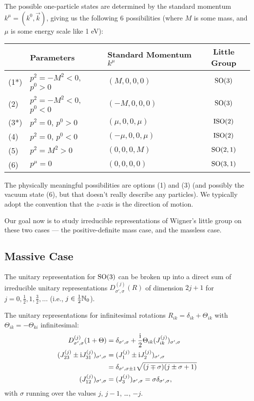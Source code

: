 The possible one-particle states are determined by the standard momentum
$k^{\mu}=(k^{0},\vec{k})$, giving us the following 6 possibilities (where $M$ is some
mass, and $\mu$ is some energy scale like 1 eV):
\begin{center}
\begin{tabular}{ll|l|c}
    & Parameters & Standard Momentum $k^{\mu}$ & Little Group\\\hline
(1*) & $p^{2}=-M^{2}<0$, $p^{0}>0$ & $(M,0,0,0)$ & $\operatorname{SO}(3)$\\
(2) & $p^{2}=-M^{2}<0$, $p^{0}<0$ & $(-M,0,0,0)$ & $\operatorname{SO}(3)$\\
(3*) & $p^{2}=0$, $p^{0}>0$ & $(\mu,0,0,\mu)$ & $\mathrm{ISO}(2)$\\
(4) & $p^{2}=0$, $p^{0}<0$ & $(-\mu,0,0,\mu)$ & $\mathrm{ISO}(2)$\\
(5) & $p^{2}=M^{2}>0$ & $(0,0,0,M)$ & $\operatorname{SO}(2,1)$\\
(6) & $p^{\mu}=0$ & $(0,0,0,0)$ & $\operatorname{SO}(3,1)$
\end{tabular}
\end{center}
The physically meaningful possibilities are options (1) and (3) (and
possibly the vacuum state (6), but that doesn't really describe any particles).
We typically adopt the convention that the $z$-axis is the direction of motion.

Our goal now is to study irreducible representations of Wigner's little
group on these two cases --- the positive-definite mass case, and the
massless case.

\subsection*{Massive Case}

The unitary representation for $\operatorname{SO}(3)$ can be broken up into a direct
sum of irreducible unitary representations $D^{(j)}_{\sigma',\sigma}(R)$
of dimension $2j+1$ for $j=0,\frac{1}{2},1,\frac{3}{2},\dots$ (i.e.,
$j\in\frac{1}{2}\mathbb{N}_{0}$).

The unitary representations for infinitesimal rotations
$R_{ik}=\delta_{ik}+\Theta_{ik}$ with $\Theta_{ik}=-\Theta_{ki}$
infinitesimal:
\begin{subequations}
\begin{align}
D^{(j)}_{\sigma',\sigma}(1 + \Theta) &= \delta_{\sigma',\sigma} + \frac{\I}{2}\Theta_{ik}(J^{(j)}_{ik})_{\sigma',\sigma}\\
(J^{(j)}_{23}\pm\I J^{(j)}_{31})_{\sigma',\sigma} &= (J^{(j)}_{1}\pm\I J^{(j)}_{2})_{\sigma',\sigma}\nonumber\\
&= \delta_{\sigma',\sigma\pm1}\sqrt{(j\mp\sigma)(j\pm\sigma+1)}\\
(J^{(j)}_{12})_{\sigma',\sigma} &= (J^{(j)}_{3})_{\sigma',\sigma} = \sigma\delta_{\sigma',\sigma},
\end{align}
\end{subequations}
with $\sigma$ running over the values $j$, $j-1$, \dots, $-j$.

